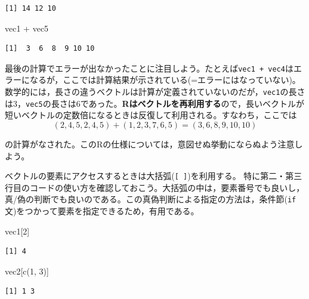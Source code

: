 \documentclass[
  a4paper,
]{ltjsbook}
\newenvironment{Shaded}{\begin{snugshade}}{\end{snugshade}}
\newcommand{\DecValTok}[1]{\textcolor[rgb]{0.68,0.00,0.00}{#1}}
\newcommand{\FunctionTok}[1]{\textcolor[rgb]{0.28,0.35,0.67}{#1}}
\newcommand{\NormalTok}[1]{\textcolor[rgb]{0.00,0.23,0.31}{#1}}
\newcommand{\SpecialCharTok}[1]{\textcolor[rgb]{0.37,0.37,0.37}{#1}}
\begin{document}
\begin{verbatim}
[1] 14 12 10
\end{verbatim}

\begin{Shaded}
\begin{Highlighting}[]
\NormalTok{vec1 }\SpecialCharTok{+}\NormalTok{ vec5}
\end{Highlighting}
\end{Shaded}

\begin{verbatim}
[1]  3  6  8  9 10 10
\end{verbatim}

最後の計算でエラーが出なかったことに注目しよう。たとえば\texttt{vec1\ +\ vec4}はエラーになるが，ここでは計算結果が示されている(=エラーにはなっていない)。数学的には，長さの違うベクトルは計算が定義されていないのだが，\texttt{vec1}の長さは3，\texttt{vec5}の長さは6であった。\textbf{Rはベクトルを再利用する}ので，長いベクトルが短いベクトルの定数倍になるときは反復して利用される。すなわち，ここでは
\[ (2,4,5,2,4,5) + (1,2,3,7,6,5) = (3,6,8,9,10,10)\]

の計算がなされた。このRの仕様については，意図せぬ挙動にならぬよう注意しよう。

ベクトルの要素にアクセスするときは大括弧(\texttt{{[}\ {]}})を利用する。
特に第二・第三行目のコードの使い方を確認しておこう。大括弧の中は，要素番号でも良いし，真/偽の判断でも良いのである。この真偽判断による指定の方法は，条件節(\texttt{if}文)をつかって要素を指定できるため，有用である。

\begin{Shaded}
\begin{Highlighting}[]
\NormalTok{vec1[}\DecValTok{2}\NormalTok{]}
\end{Highlighting}
\end{Shaded}

\begin{verbatim}
[1] 4
\end{verbatim}

\begin{Shaded}
\begin{Highlighting}[]
\NormalTok{vec2[}\FunctionTok{c}\NormalTok{(}\DecValTok{1}\NormalTok{, }\DecValTok{3}\NormalTok{)]}
\end{Highlighting}
\end{Shaded}

\begin{verbatim}
[1] 1 3
\end{verbatim}
\end{document}
